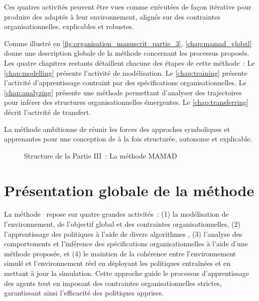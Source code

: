 \noindent
Ces quatres activités peuvent être vues comme exécutées de façon itérative pour produire des  adaptés à leur environnement, alignés sur des contraintes organisationnelles, explicables et robustes.

\medskip

\noindent
Comme illustré en \autoref{fig:organisation_manuscrit_partie_3}, \autoref{chap:mamad_global} donne une description globale de la méthode concernant les processus proposés. Les quatre chapitres restants détaillent chacune des étapes de cette méthode~:
Le \autoref{chap:modelling} présente l'activité de modélisation.
Le \autoref{chap:training} présente l'activité d'apprentissage contraint par des spécifications organisationnelles.
Le \autoref{chap:analyzing} présente une méthode permettant d'analyser des trajectoires pour inférer des structures organisationnelles émergentes.
Le \autoref{chap:transferring} décrit l'activité de transfert.

La méthode  ambitionne de réunir les forces des approches symboliques et apprenantes pour une conception de  à la fois structurée, autonome et explicable.

\begin{figure}[h!]
  \centering
  \resizebox{\linewidth}{!}{%
    
  }
  \caption{Structure de la Partie III~: La méthode MAMAD}
  \label{fig:organisation_manuscrit_partie_3}
\end{figure}



\clearpage
\thispagestyle{empty}
\null
\newpage

\chapter{Présentation globale de la méthode}
\label{chap:mamad_global}

La méthode ~\footnotemark[2] repose sur quatre grandes activités~: (1) la modélisation de l'environnement, de l'objectif global et des contraintes organisationnelles, (2) l'apprentissage des politiques à l'aide de divers algorithmes , (3) l'analyse des comportements et l'inférence des spécifications organisationnelles à l'aide d'une méthode proposée, et (4) le maintien de la cohérence entre l'environnement simulé et l'environnement réel en déployant les politiques entraînées et en mettant à jour la simulation. Cette approche guide le processus d'apprentissage des agents tout en imposant des contraintes organisationnelles strictes, garantissant ainsi l'efficacité des politiques apprises.

